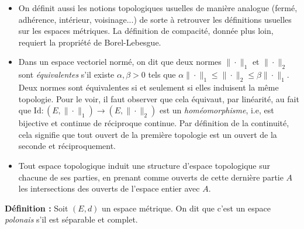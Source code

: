 \documentclass[12pt]{article}
\begin{document}
\begin{itemize}
  \item On définit aussi les notions topologiques usuelles de manière analogue (fermé, adhérence, intérieur, voisinage...) de sorte à retrouver les définitions usuelles sur les espaces métriques. La définition de compacité, donnée plus loin, requiert la propriété de Borel-Lebesgue.

  \item Dans un espace vectoriel normé, on dit que deux normes $\|\cdot \|_1$ et $\|\cdot \|_2$ sont \textit{équivalentes} s'il existe $\alpha, \beta > 0$ tels que $\alpha \|\cdot \|_1 \leqslant \|\cdot \|_2 \leqslant \beta \|\cdot \|_1 $. Deux normes sont équivalentes si et seulement si elles induisent la même topologie. Pour le voir, il faut observer que cela équivaut, par linéarité, au fait que $ \mathrm{Id} : (E,\|\cdot \|_1) \to (E,\|\cdot \|_2) $ est un \textit{homéomorphisme}, i.e, est bijective et continue de réciproque continue. Par définition de la continuité, cela signifie que tout ouvert de la première topologie est un ouvert de la seconde et réciproquement. 

  \item Tout espace topologique induit une structure d'espace topologique sur chacune de ses parties, en prenant comme ouverts de cette dernière partie $A$ les intersections des ouverts de l'espace entier avec $A$. 

\end{itemize}

\medskip

\textbf{Définition :} Soit $(E,d)$ un espace métrique. On dit que c'est un espace \textit{polonais} s'il est séparable et complet.

\begin{comment}

\textbf{Définition :} Soit $(X,\mathcal T)$ un espace topologique. On dit que c'est un espace \textit{polonais} s'il est métrisable, et si l'espace métrique sous-jacent est polonais.

\textbf{Définition :} Une partie $A$ d'un espace topologique est dite relativement compacte si son adhérence $\overline A$ est compacte (pour la topologie induite).

\textbf{Définition :} On dit que $(\mathcal X, \mathcal T)$ est localement compact si tout point de $X$ admet un voisinage compact.

\textbf{Théorème :} (...)

\end{comment}
\end{document}
